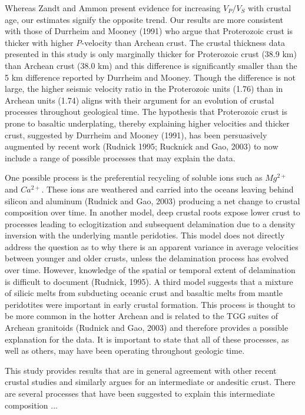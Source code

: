 \documentclass[review]{elsarticle}
\begin{document}
Whereas Zandt and Ammon present evidence for increasing $V_P/V_S$ with crustal age, our estimates signify the opposite trend. Our results are more consistent with those of Durrheim and Mooney (1991) who argue that Proterozoic crust is thicker with higher {\it P}-velocity than Archean crust. The crustal thickness data presented in this study is only marginally thicker for Proterozoic crust (38.9 km) than Archean crust (38.0 km) and this difference is significantly smaller than the 5 km difference reported by Durrheim and Mooney. Though the difference is not large, the higher seismic velocity ratio in the Proterozoic units (1.76) than in Archean units (1.74) aligns with their argument for an evolution of crustal processes throughout geological time. The hypothesis that Proterozoic crust is prone to basaltic underplating, thereby explaining higher velocities and thicker crust, suggested by Durrheim and Mooney (1991), has been persuasively augmented by recent work (Rudnick 1995; Rucknick and Gao, 2003) to now include a range of possible processes that may explain the data.

One possible process is the preferential recycling of soluble ions such as $Mg^{2+}$ and $Ca^{2+}$. These ions are weathered and carried into the oceans leaving behind silicon and aluminum (Rudnick and Gao, 2003) producing a net change to crustal composition over time. In another model, deep crustal roots expose lower crust to processes leading to eclogitization and subsequent delamination due to a density inversion with the underlying mantle peridoties. This model does not directly address the question as to why there is an apparent variance in average velocities between younger and older crusts, unless the delamination process has evolved over time. However, knowledge of the spatial or temporal extent of delamination is difficult to document (Rudnick, 1995). A third model suggests that a mixture of silicic melts from subducting oceanic crust and basaltic melts from mantle peridotites were important in early crustal formation. This process is thought to be more common in the hotter Archean and is related to the TGG suites of Archean granitoids (Rudnick and Gao, 2003) and therefore provides a possible explanation for the data. It is important to state that all of these processes, as well as others, may have been operating throughout geologic time.

This study provides results that are in general agreement with other recent crustal studies and similarly argues for an intermediate or andesitic crust. There are several processes that have been suggested to explain this intermediate composition ...
\end{document}
